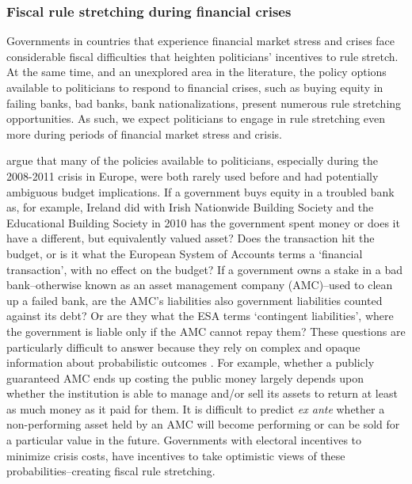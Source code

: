 \documentclass[]{article}
\begin{document}

\subsubsection{Fiscal rule stretching during financial crises}

Governments in countries that experience financial market stress and crises face considerable fiscal difficulties \cite[see][]{Laeven2012} that heighten politicians' incentives to rule stretch. At the same time, and an unexplored area in the literature, the policy options available to politicians to respond to financial crises, such as buying equity in failing banks, bad banks, bank nationalizations, present numerous rule stretching opportunities. As such, we expect politicians to engage in rule stretching even more during periods of financial market stress and crisis.

\cite{GandrudHallerberg2016} argue that many of the policies available to politicians, especially during the 2008-2011 crisis in Europe, were both rarely used before and had potentially ambiguous budget implications. If a government buys equity in a troubled bank as, for example, Ireland did with Irish Nationwide Building Society and the Educational Building Society in 2010 has the government spent money or does it have a different, but equivalently valued asset? Does the transaction hit the budget, or is it what the European System of Accounts terms a `financial transaction', with no effect on the budget? If a government owns a stake in a bad bank--otherwise known as an asset management company (AMC)--used to clean up a failed bank, are the AMC's liabilities also government liabilities counted against its debt? Or are they what the ESA terms `contingent liabilities', where the government is liable only if the AMC cannot repay them? These questions are particularly difficult to answer because they rely on complex and opaque information about probabilistic outcomes \citep{gandrudOkeeffe2016}. For example, whether a publicly guaranteed AMC ends up costing the public money largely depends upon whether the institution is able to manage and/or sell its assets to return at least as much money as it paid for them. It is difficult to predict \emph{ex ante} whether a non-performing asset held by an AMC will become performing or can be sold for a particular value in the future. Governments with electoral incentives to minimize crisis costs, have incentives to take optimistic views of these probabilities--creating fiscal rule stretching.
\end{document}
